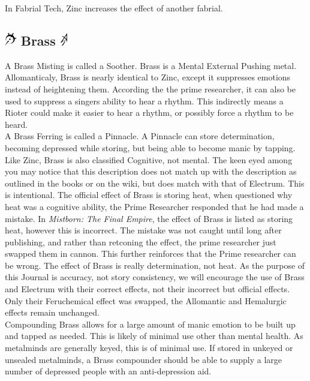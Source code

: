 \documentclass[conference]{IEEEtran}
\begin{document}
In Fabrial Tech, Zinc increases the effect of another fabrial.\cite{RoW-E7}

\subsection*{\includegraphics[height=1em]{images/Brass.png}  Brass \includegraphics[height=1em]{images/Brass_(Feruchemy).png}}
A Brass Misting is called a Soother.\cite{ARS}  Brass is a Mental External Pushing metal.\cite{AL-TB}  Allomanticaly, Brass is nearly identical to Zinc, except it suppresses emotions instead of heightening them.\cite{ARS}
According the the prime researcher, it can also be used to suppress a singers ability to hear a rhythm.\cite{soothe-rythem}  This indirectly means a Rioter could make it easier to hear a rhythm, or possibly force a rhythm to be heard.\\

A Brass Ferring is called a Pinnacle.\cite{ARS}  A Pinnacle can store determination, becoming depressed while storing, but being able to become manic by tapping.  Like Zinc, Brass is also classified Cognitive, not mental.\cite{FE-TB}  
The keen eyed among you may notice that this description does not match up with the description as outlined in the books or on the wiki, but does match with that of Electrum.  This is intentional.  The official effect of Brass is storing heat, when questioned why heat was a cognitive ability, the Prime Researcher responded that he had made a mistake.\cite{mistake}  In \textit{Mistborn: The Final Empire}, the effect of Brass is listed as storing heat, however this is incorrect.  The mistake was not caught until long after publishing, and rather than retconing the effect, the prime researcher just swapped them in cannon.  This further reinforces that the Prime researcher can be wrong.\cite{unreliability}  The effect of Brass is really determination, not heat.  As the purpose of this Journal is accuracy, not story consistency, we will encourage the use of Brass and Electrum with their correct effects, not their incorrect but official effects.  Only their Feruchemical effect was swapped, the Allomantic and Hemalurgic effects remain unchanged.\\

Compounding Brass allows for a large amount of manic emotion to be built up and tapped as needed.  This is likely of minimal use other than mental health.  As metalminds are generally keyed, this is of minimal use.  If stored in unkeyed or unsealed metalminds, a Brass compounder should be able to supply a large number of depressed people with an anti-depression aid.\\
\end{document}
